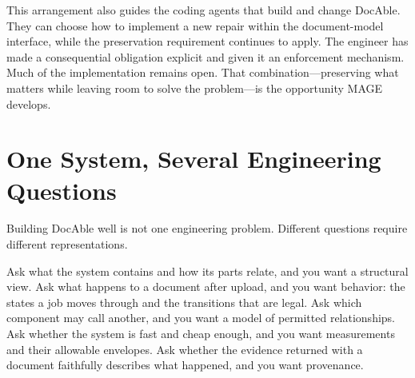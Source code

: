 
This arrangement also guides the coding agents that build and change DocAble. They can choose how to implement a new repair within the document-model interface, while the preservation requirement continues to apply. The engineer has made a consequential obligation explicit and given it an enforcement mechanism. Much of the implementation remains open. That combination---preserving what matters while leaving room to solve the problem---is the opportunity MAGE develops.

\section{One System, Several Engineering Questions}\label{heading:one-system-several-engineering-questions}



Building DocAble well is not one engineering problem. Different questions require different representations.


Ask what the system contains and how its parts relate, and you want a structural view. Ask what happens to a document after upload, and you want behavior: the states a job moves through and the transitions that are legal. Ask which component may call another, and you want a model of permitted relationships. Ask whether the system is fast and cheap enough, and you want measurements and their allowable envelopes. Ask whether the evidence returned with a document faithfully describes what happened, and you want provenance.


